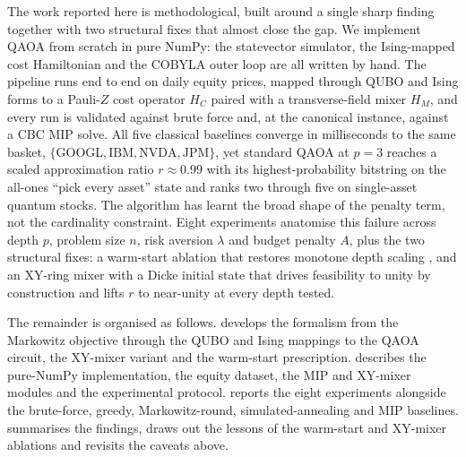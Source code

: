 The work reported here is methodological, built around a single sharp finding together with two structural fixes that almost close the gap. We implement QAOA from scratch in pure NumPy: the statevector simulator, the Ising-mapped cost Hamiltonian and the COBYLA outer loop are all written by hand. The pipeline runs end to end on daily equity prices, mapped through QUBO and Ising forms to a Pauli-$Z$ cost operator $H_C$ paired with a transverse-field mixer $H_M$, and every run is validated against brute force and, at the canonical instance, against a CBC MIP solve. All five classical baselines converge in milliseconds to the same basket, $\{\text{GOOGL}, \text{IBM}, \text{NVDA}, \text{JPM}\}$, yet standard QAOA at $p=3$ reaches a scaled approximation ratio $r \approx 0.99$ with its highest-probability bitstring on the all-ones ``pick every asset'' state and ranks two through five on single-asset quantum stocks. The algorithm has learnt the broad shape of the penalty term, not the cardinality constraint. Eight experiments anatomise this failure across depth $p$, problem size $n$, risk aversion $\lambda$ and budget penalty $A$, plus the two structural fixes: a warm-start ablation that restores monotone depth scaling \parencite{zhou2018qaoa}, and an XY-ring mixer with a Dicke initial state \parencite{mancilla2026constrained,bartschi2022dicke} that drives feasibility to unity by construction and lifts $r$ to near-unity at every depth tested.

The remainder is organised as follows.  develops the formalism from the Markowitz objective through the QUBO and Ising mappings to the QAOA circuit, the XY-mixer variant and the warm-start prescription.  describes the pure-NumPy implementation, the equity dataset, the MIP and XY-mixer modules and the experimental protocol.  reports the eight experiments alongside the brute-force, greedy, Markowitz-round, simulated-annealing and MIP baselines.  summarises the findings, draws out the lessons of the warm-start and XY-mixer ablations and revisits the caveats above.
